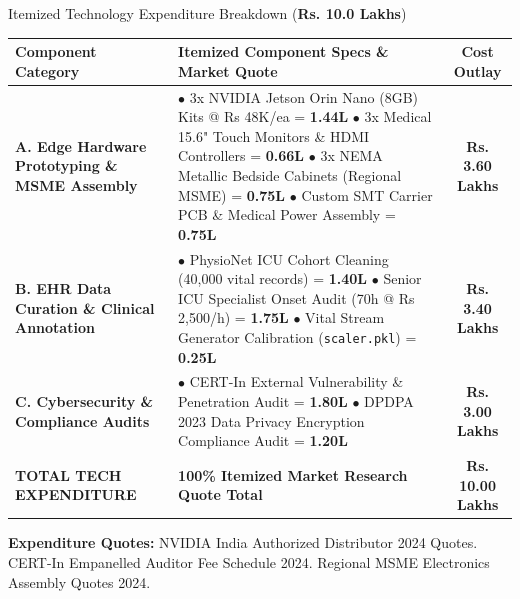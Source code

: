 \documentclass[aspectratio=169, 11pt]{beamer}
\begin{document}
\begin{frame}{Itemized Technology Expenditure Breakdown (\textbf{Rs. 10.0 Lakhs})}
    \tiny
    \setlength{\tabcolsep}{3.5pt}
    \renewcommand{\arraystretch}{1.1}
    \begin{tabular}{p{3.2cm} p{5.5cm} c}
    \hline
    \rowcolor{lightCyanBg}
    \textbf{\textcolor{neonCyan}{Component Category}} & \textbf{\textcolor{neonCyan}{Itemized Component Specs \& Market Quote}} & \textbf{\textcolor{neonCyan}{Cost Outlay}} \\
    \hline
    \textbf{A. Edge Hardware Prototyping \& MSME Assembly} & 
    $\bullet$ 3x NVIDIA Jetson Orin Nano (8GB) Kits @ Rs 48K/ea = \textbf{1.44L} \newline
    $\bullet$ 3x Medical 15.6" Touch Monitors \& HDMI Controllers = \textbf{0.66L} \newline
    $\bullet$ 3x NEMA Metallic Bedside Cabinets (Regional MSME) = \textbf{0.75L} \newline
    $\bullet$ Custom SMT Carrier PCB \& Medical Power Assembly = \textbf{0.75L} & 
    \textbf{\textcolor{neonCyan}{Rs. 3.60 Lakhs}} \\
    \hline
    \textbf{B. EHR Data Curation \& Clinical Annotation} & 
    $\bullet$ PhysioNet ICU Cohort Cleaning (40,000 vital records) = \textbf{1.40L} \newline
    $\bullet$ Senior ICU Specialist Onset Audit (70h @ Rs 2,500/h) = \textbf{1.75L} \newline
    $\bullet$ Vital Stream Generator Calibration (\texttt{scaler.pkl}) = \textbf{0.25L} & 
    \textbf{\textcolor{neonTeal}{Rs. 3.40 Lakhs}} \\
    \hline
    \textbf{C. Cybersecurity \& Compliance Audits} & 
    $\bullet$ CERT-In External Vulnerability \& Penetration Audit = \textbf{1.80L} \newline
    $\bullet$ DPDPA 2023 Data Privacy Encryption Compliance Audit = \textbf{1.20L} & 
    \textbf{\textcolor{neonAmber}{Rs. 3.00 Lakhs}} \\
    \hline
    \rowcolor{lightTealBg}
    \textbf{\textcolor{textColor}{TOTAL TECH EXPENDITURE}} & \textbf{\textcolor{textColor}{100\% Itemized Market Research Quote Total}} & \textbf{\textcolor{neonCyan}{Rs. 10.00 Lakhs}} \\
    \hline
    \end{tabular}

    \vspace{0.02cm}
    \begin{block}{}
        \tiny \textcolor{neonCyan}{\textbf{Expenditure Quotes:}} \textcolor{mutedText}{NVIDIA India Authorized Distributor 2024 Quotes. CERT-In Empanelled Auditor Fee Schedule 2024. Regional MSME Electronics Assembly Quotes 2024.}
    \end{block}
\end{frame}
\end{document}
